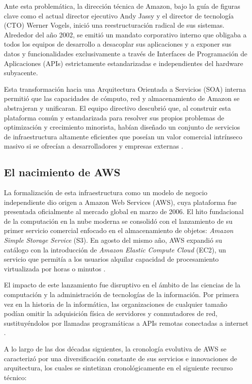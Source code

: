 \documentclass[12pt,a4paper]{article}
\begin{document}
Ante esta problemática, la dirección técnica de Amazon, bajo la guía de figuras clave como el actual director ejecutivo Andy Jassy y el director de tecnología (CTO) Werner Vogels, inició una reestructuración radical de sus sistemas. Alrededor del año 2002, se emitió un mandato corporativo interno que obligaba a todos los equipos de desarrollo a desacoplar sus aplicaciones y a exponer sus datos y funcionalidades exclusivamente a través de Interfaces de Programación de Aplicaciones (APIs) estrictamente estandarizadas e independientes del hardware subyacente.

Esta transformación hacia una Arquitectura Orientada a Servicios (SOA) interna permitió que las capacidades de cómputo, red y almacenamiento de Amazon se abstrajeran y unificaran. El equipo directivo descubrió que, al construir esta plataforma común y estandarizada para resolver sus propios problemas de optimización y crecimiento minorista, habían diseñado un conjunto de servicios de infraestructura altamente eficientes que poseían un valor comercial intrínseco masivo si se ofrecían a desarrolladores y empresas externas \parencite{awsWhatIs}.
\subsection{El nacimiento de AWS}
La formalización de esta infraestructura como un modelo de negocio independiente dio origen a Amazon Web Services (AWS), cuya plataforma fue presentada oficialmente al mercado global en marzo de 2006. El hito fundacional de la computación en la nube moderna se consolidó con el lanzamiento de su primer servicio comercial enfocado en el almacenamiento de objetos: \textit{Amazon Simple Storage Service} (S3). En agosto del mismo año, AWS expandió su catálogo con la introducción de \textit{Amazon Elastic Compute Cloud} (EC2), un servicio que permitía a los usuarios alquilar capacidad de procesamiento virtualizada por horas o minutos \parencite{awsWhatIs}.

El impacto de este lanzamiento fue disruptivo en el ámbito de las ciencias de la computación y la administración de tecnologías de la información. Por primera vez en la historia de la informática, las organizaciones de cualquier tamaño podían omitir la adquisición física de servidores y conmutadores de red, sustituyéndolos por llamadas programáticas a APIs remotas conectadas a internet \parencite{armbrust2010}.

A lo largo de las dos décadas siguientes, la cronología evolutiva de AWS se caracterizó por una diversificación constante de sus servicios e innovaciones de arquitectura, los cuales se sintetizan cronológicamente en el siguiente recurso técnico:
\end{document}
